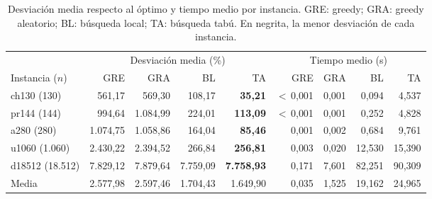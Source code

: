 \begin{table}[H]
\centering\small\setlength{\tabcolsep}{4pt}\renewcommand{\arraystretch}{1.15}
\begin{adjustbox}{max width=\textwidth}
\begin{tabular}{lrrrrrrrr}
\toprule
 & \multicolumn{4}{c}{Desviación media (\%)} & \multicolumn{4}{c}{Tiempo medio (s)} \\
\cmidrule(lr){2-5}\cmidrule(lr){6-9}
Instancia ($n$) & GRE & GRA & BL & TA & GRE & GRA & BL & TA \\
\midrule
\rowcolor{gray!10}ch130 (130) & 561{,}17 & 569{,}30 & 108{,}17 & \textbf{35{,}21} & $<$\,0{,}001 & 0{,}001 & 0{,}094 & 4{,}537 \\
pr144 (144) & 994{,}64 & 1{.}084{,}99 & 224{,}01 & \textbf{113{,}09} & $<$\,0{,}001 & 0{,}001 & 0{,}252 & 4{,}828 \\
\rowcolor{gray!10}a280 (280) & 1{.}074{,}75 & 1{.}058{,}86 & 164{,}04 & \textbf{85{,}46} & 0{,}001 & 0{,}002 & 0{,}684 & 9{,}761 \\
u1060 (1{.}060) & 2{.}430{,}22 & 2{.}394{,}52 & 266{,}84 & \textbf{256{,}81} & 0{,}003 & 0{,}020 & 12{,}530 & 15{,}390 \\
\rowcolor{gray!10}d18512 (18{.}512) & 7{.}829{,}12 & 7{.}879{,}64 & 7{.}759{,}09 & \textbf{7{.}758{,}93} & 0{,}171 & 7{,}601 & 82{,}251 & 90{,}309 \\
\midrule
Media & 2{.}577{,}98 & 2{.}597{,}46 & 1{.}704{,}43 & 1{.}649{,}90 & 0{,}035 & 1{,}525 & 19{,}162 & 24{,}965 \\
\bottomrule
\end{tabular}
\end{adjustbox}
\caption{Desviación media respecto al óptimo y tiempo medio por instancia. GRE: greedy; GRA: greedy aleatorio; BL: búsqueda local; TA: búsqueda tabú. En negrita, la menor desviación de cada instancia.}
\label{tab:resumen}
\end{table}

